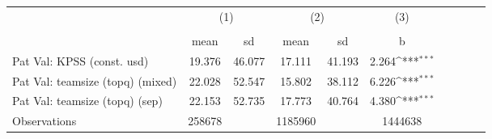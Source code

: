 {
\def\sym#1{\ifmmode^{#1}\else\(^{#1}\)\fi}
\begin{tabular}{l*{3}{ccc}}
\hline\hline
                    &\multicolumn{2}{c}{(1)}  &\multicolumn{2}{c}{(2)}  &\multicolumn{1}{c}{(3)}\\
                    &\multicolumn{2}{c}{}     &\multicolumn{2}{c}{}     &\multicolumn{1}{c}{} \\
                    &        mean&          sd&        mean&          sd&           b         \\
\hline
Pat Val: KPSS (const. usd)&      19.376&      46.077&      17.111&      41.193&       2.264\sym{***}\\
Pat Val: teamsize (topq) (mixed)&      22.028&      52.547&      15.802&      38.112&       6.226\sym{***}\\
Pat Val: teamsize (topq) (sep)&      22.153&      52.735&      17.773&      40.764&       4.380\sym{***}\\
\hline
Observations        &      258678&            &     1185960&            &     1444638         \\
\hline\hline
\end{tabular}
}
